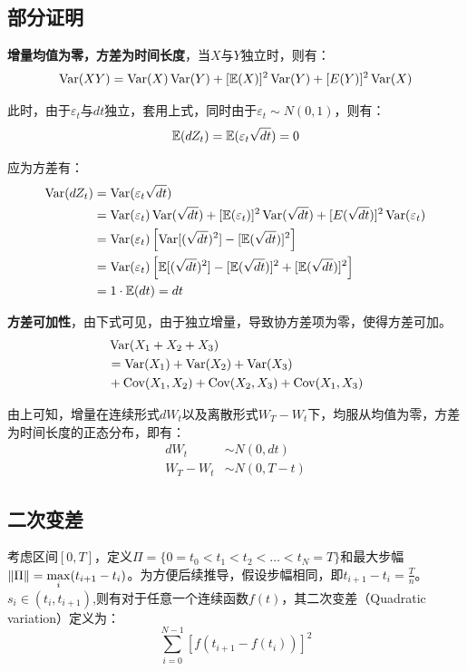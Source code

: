 \documentclass[11pt]{article}
\begin{document}
\subsection{部分证明}

\textbf{增量均值为零，方差为时间长度}，当$X$与$Y$独立时，则有：
\begin{equation*}
    \operatorname{Var}(XY) = \operatorname{Var}(X)\operatorname{Var}(Y) + [\mathbb{E}(X)]^2 \operatorname{Var}(Y) + [E(Y)]^2 \operatorname{Var}(X)
\end{equation*}

此时，由于$\varepsilon_t$与$dt$独立，套用上式，同时由于$\varepsilon_t \sim N(0,1)$，则有：
\begin{equation*}
    \mathbb{E}(dZ_t) = \mathbb{E}(\varepsilon_t \sqrt{dt}) = 0
\end{equation*}

应为方差有：
\begin{align*}
    \operatorname{Var}(dZ_t) & = \operatorname{Var}( \varepsilon_t \sqrt{dt}) \\
    & =  \operatorname{Var}(\varepsilon_t) \operatorname{Var}(\sqrt{dt}) + [\mathbb{E}(\varepsilon_t)]^2 \operatorname{Var}(\sqrt{dt}) + [E(\sqrt{dt})]^2 \operatorname{Var}(\varepsilon_t) \\
    & = \operatorname{Var}(\varepsilon_t) \left[ \operatorname{Var}[(\sqrt{dt})^2] - [\mathbb{E}(\sqrt{dt})]^2 \right] \\
    & = \operatorname{Var}(\varepsilon_t) \left[ \mathbb{E}[(\sqrt{dt})^2] - [\mathbb{E}(\sqrt{dt})]^2 + [\mathbb{E}(\sqrt{dt})]^2 \right] \\
    & = 1 \cdot \mathbb{E}(dt) = dt
\end{align*}

\textbf{方差可加性}，由下式可见，由于独立增量，导致协方差项为零，使得方差可加。
\begin{align*}
     & \operatorname{Var}(X_1+X_2+X_3) \\
     & = \operatorname{Var}(X_1) + \operatorname{Var}(X_2) + \operatorname{Var}(X_3) \\
     & + \operatorname{Cov}(X_1,X_2) + \operatorname{Cov}(X_2,X_3) + \operatorname{Cov}(X_1,X_3)
\end{align*}

由上可知，增量在连续形式$dW_t$以及离散形式$W_T-W_t$下，均服从均值为零，方差为时间长度的正态分布，即有：
\begin{align*}
    dW_t & \sim N(0,dt) \\
    W_T - W_t & \sim N(0,T-t)
\end{align*}

\subsection{二次变差}

考虑区间$[0,T]$，定义$\Pi=\{0=t_0<t_1<t_2<\dots<t_N=T\}$和最大步幅$\left\lVert \Pi\right\rVert = \max\limits_{i}(t_{i+1}-t_{i})$。为方便后续推导，假设步幅相同，即$t_{i+1} - t_{i} = \tfrac{T}{n}$。$s_i \in (t_i,t_{i+1})$,则有对于任意一个连续函数$f(t)$，其二次变差（Quadratic variation）定义为：
\begin{equation*}
    \sum^{N-1}_{i=0} \left[ f(t_{i+1} - f(t_i)) \right]^2
\end{equation*}
\end{document}
